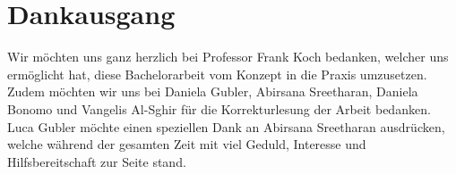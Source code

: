 \section{Dankausgang}
Wir möchten uns ganz herzlich bei Professor Frank Koch bedanken, welcher uns ermöglicht hat, diese Bachelorarbeit vom Konzept in die Praxis umzusetzen. \\

Zudem möchten wir uns bei Daniela Gubler, Abirsana Sreetharan, Daniela Bonomo und Vangelis Al-Sghir für die Korrekturlesung der Arbeit bedanken. \\

Luca Gubler möchte einen speziellen Dank an Abirsana Sreetharan ausdrücken, welche während der gesamten Zeit mit viel Geduld, Interesse und Hilfsbereitschaft zur Seite stand.